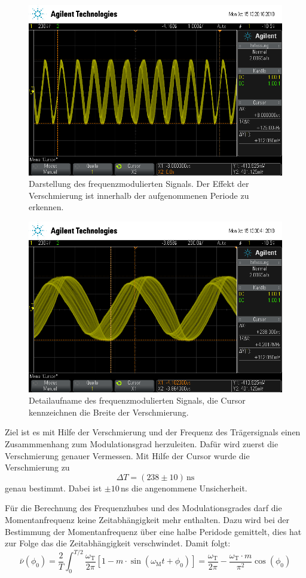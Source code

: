 \begin{figure}
  \centering
  \includegraphics[width=0.7\linewidth]{ressources/scope_455.png}
  \caption{Darstellung des frequenzmodulierten Signals. Der Effekt der
  Verschmierung ist innerhalb der aufgenommenen Periode zu erkennen.}
  \label{sig1}
\end{figure}
\begin{figure}
  \centering
  \includegraphics[width=0.7\linewidth]{ressources/scope_456.png}
  \caption{Detailaufname des frequenzmodulierten Signals, die
  Cursor kennzeichnen die Breite der Verschmierung.}
  \label{sig2}
\end{figure}
Ziel ist es mit Hilfe der Verschmierung und der Frequenz des Trägersignals
einen Zusammmenhang zum Modulationsgrad herzuleiten. Dafür wird zuerst
die Verschmierung genauer Vermessen. Mit Hilfe der Cursor wurde die
Verschmierung zu
$$\Delta T = (238\pm 10)\, \text{ns}$$
genau bestimmt. Dabei ist $\pm 10\,$ns die angenommene Unsicherheit.

Für die Berechnung des Frequenzhubes und des Modulationsgrades darf die
Momentanfrequenz keine Zeitabhängigkeit mehr enthalten. Dazu wird bei der
Bestimmung der Momentanfrequenz über eine halbe Peridode gemittelt, dies
hat zur Folge das die Zeitabhängigkeit verschwindet. Damit folgt:
$$\bar{\nu}(\phi_0)=\frac{2}{T} \int_0^{T/2} \frac{\omega_\text{T}}{2\pi}
[1-m\cdot \sin (\omega_\text{M}t+ \phi_0)]=\frac{\omega_\text{T}}{2\pi}-
\frac{\omega_\text{T}\cdot m}{\pi^2}\cos(\phi_0)$$

